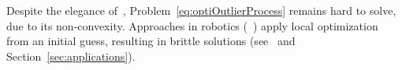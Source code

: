 Despite the elegance of~, Problem~\eqref{eq:optiOutlierProcess} remains hard to solve, 
due to its non-convexity. 
Approaches in robotics (\eg~\cite{Agarwal13icra,Sunderhauf12iros}) apply local optimization from an initial guess, 
resulting in brittle solutions (see~\cite{Carlone18ral-robustPGO2D} and Section~\ref{sec:applications}). 

